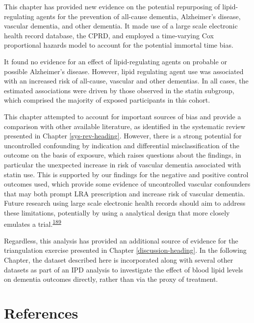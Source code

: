 \documentclass[a4paper, twoside]{templates/ociamthesis}
\begin{document}
This chapter has provided new evidence on the potential repurposing of lipid-regulating agents for the prevention of all-cause dementia, Alzheimer's disease, vascular dementia, and other dementia. It made use of a large scale electronic health record database, the CPRD, and employed a time-varying Cox proportional hazards model to account for the potential immortal time bias.

It found no evidence for an effect of lipid-regulating agents on probable or possible Alzheimer's disease. However, lipid regulating agent use was associated with an increased risk of all-cause, vascular and other dementias. In all cases, the estimated associations were driven by those observed in the statin subgroup, which comprised the majority of exposed participants in this cohort.

This chapter attempted to account for important sources of bias and provide a comparison with other available literature, as identified in the systematic review presented in Chapter \ref{sys-rev-heading}. However, there is a strong potential for uncontrolled confounding by indication and differential misclassification of the outcome on the basis of exposure, which raises questions about the findings, in particular the unexpected increase in risk of vascular dementia associated with statin use. This is supported by our findings for the negative and positive control outcomes used, which provide some evidence of uncontrolled vascular confounders that may both prompt LRA prescription and increase risk of vascular dementia. Future research using large scale electronic health records should aim to address these limitations, potentially by using a analytical design that more closely emulates a trial.\textsuperscript{\protect\hyperlink{ref-danaei2013b}{189}}

Regardless, this analysis has provided an additional source of evidence for the triangulation exercise presented in Chapter \ref{discussion-heading}. In the following Chapter, the dataset described here is incorporated along with several other datasets as part of an IPD analysis to investigate the effect of blood lipid levels on dementia outcomes directly, rather than via the proxy of treatment.

\newpage

\hypertarget{references-3}{%
\section{References}\label{references-3}}
\end{document}
